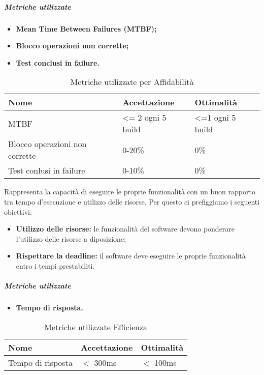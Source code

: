 \subparagraph{Metriche utilizzate}
\begin{itemize}
	\item \textbf{Mean Time Between Failures (MTBF)\pedice;}
	\item \textbf{Blocco operazioni non corrette;}
	\item \textbf{Test conclusi in failure.}
\end{itemize}
\begin{table}[!htpb]
	\centering
	\renewcommand{\arraystretch}{2} 
	\begin{tabular}{|l|l|l|}
		\rowcolor{orange!50}
		\hline
		\textbf{Nome} &  \textbf{Accettazione} & \textbf{Ottimalità} \\ \hline
		MTBF     &     \textless= 2 ogni 5 build       &     \textless=1 ogni 5 build          \\ \hline
		Blocco operazioni non corrette   &    0-20\% &  0\%       \\ \hline
		Test conlusi in failure          &     0-10\%          &      0\%        \\ \hline
	\end{tabular}
	\caption{Metriche utilizzate per Affidabilità}
\end{table}
Rappresenta la capacità di eseguire le proprie funzionalità con un buon rapporto tra tempo d'esecuzione e utilizzo delle risorse. Per questo ci prefiggiamo i seguenti obiettivi:
\begin{itemize}
	\item \textbf{Utilizzo delle risorse:} le funzionalità del software devono ponderare l'utilizzo delle risorse a diposizione;
	\item \textbf{Rispettare la deadline:} il software deve eseguire le proprie funzionalità entro i tempi prestabiliti.
\end{itemize}

\subparagraph{Metriche utilizzate}
\begin{itemize}
	\item \textbf{Tempo di risposta.}
\end{itemize}
\begin{table}[!htpb]
	\centering
	\renewcommand{\arraystretch}{2} 
		\begin{tabular}{|l|l|l|}
			\rowcolor{orange!50}
			\hline
			\textbf{Nome} & \textbf{Accettazione} & \textbf{Ottimalità} \\ \hline
			Tempo di risposta        &           $<$ 300ms            &      $<$ 100ms         \\ \hline                       
		\end{tabular}
	\caption{Metriche utilizzate Efficienza}
\end{table}

